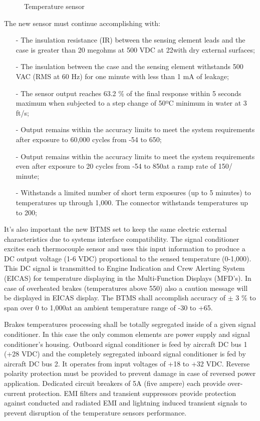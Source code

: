 \begin{figure}[H] %
    \caption{Temperature sensor}
    \label{fig:BTMSsensor}
\end{figure}


The new sensor must continue accomplishing with:
\begin{itemize}
\item[-]The insulation resistance (IR) between the sensing element leads and the case is greater than 20 megohms at 500 VDC at 22\celsius with dry external surfaces;
\item[-]The insulation between the case and the sensing element withstands 500 VAC (RMS at 60 Hz) for one minute with less than 1 mA of leakage;
\item[-]The sensor output reaches 63.2 \% of the final response within 5 seconds maximum when subjected to a step change of 50ºC minimum in water at 3 ft/s;
\item[-]Output remains within the accuracy limits to meet the system requirements after exposure to 60,000 cycles from -54 to 650\celsius;
\item[-]Output remains within the accuracy limits to meet the system requirements even after exposure to 20 cycles from -54 to 850\celsius at a ramp rate of 150\celsius / minute;
\item[-]Withstands a limited number of short term exposures (up to 5 minutes) to temperatures up through 1,000\celsius. The connector withstands temperatures up to 200\celsius;
\end{itemize}

It's also important the new BTMS set to keep the same electric external characteristics due to systems interface compatibility. The signal conditioner excites each thermocouple sensor and uses this input information to produce a DC output voltage (1-6 VDC) proportional to the sensed temperature (0-1,000\celsius). This DC signal is transmitted to Engine Indication and Crew Alerting System (EICAS) for temperature displaying in the Multi-Function Displays (MFD's). In case of overheated brakes (temperatures above 550\celsius) also a caution message will be displayed in EICAS display. The BTMS shall accomplish accuracy of $\pm$ 3 \% to span over 0 to 1,000\celsius at an ambient temperature range of -30 to +65\celsius.

Brakes temperatures processing shall be totally segregated inside of a given signal conditioner. In this case the only common elements are power supply and signal conditioner's housing. Outboard signal conditioner is feed by aircraft DC bus 1 (+28 VDC) and the completely segregated inboard signal conditioner is fed by aircraft DC bus 2. It operates from input voltages of +18 to +32 VDC. Reverse polarity protection must be provided to prevent damage in case of reversed power application. Dedicated circuit breakers of 5A (five ampere) each provide over-current protection. EMI filters and transient suppressors provide protection against conducted and radiated EMI and lightning induced transient signals to prevent disruption of the temperature sensors performance.

